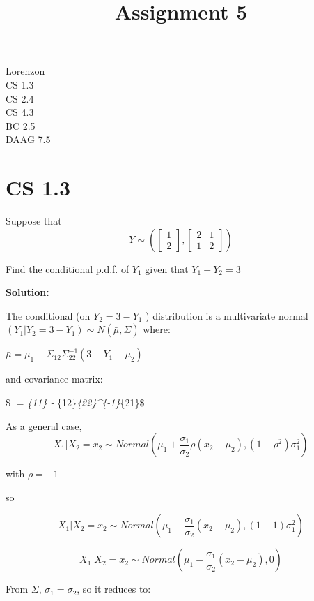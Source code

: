 \documentclass[11pt]{article}
\title{Assignment 5}
\begin{document}
    
    
    \maketitle
    
    

    
    Lorenzon\\
CS 1.3\\
CS 2.4\\
CS 4.3\\
BC 2.5\\
DAAG 7.5

    \hypertarget{cs-1.3}{%
\section{CS 1.3}\label{cs-1.3}}

    Suppose that \[ Y \sim 
\left(
\begin{bmatrix}
    1  \\
   2 
\end{bmatrix},
\begin{bmatrix}
2 & 1 \\
1 & 2  
\end{bmatrix}
\right) \]

Find the conditional p.d.f. of \(Y_1\) given that \(Y_1 + Y_2 = 3\)

    \textbf{Solution:}

The conditional (on \(Y_2 = 3 - Y_1\) ) distribution is a multivariate
normal \((Y_1 | Y_2 = 3 - Y_1) \sim N(\bar\mu , \bar\Sigma)\) where:

\(\bar\mu = \mu_1 + \Sigma_{12} \Sigma_{22}^{-1}(3 -Y_1 - \mu_2)\)

and covariance matrix:

\$ \bar\Sigma = \Sigma\emph{\{11\} -
\Sigma}\{12\}\Sigma\emph{\{22\}\^{}\{-1\}\Sigma}\{21\}\$

As a general case,
\[X_1 | X_2 = x_2 \sim Normal \left(\mu_1 + \frac{\sigma_1}{\sigma_2} \rho (x_2-\mu_2), (1-\rho^2)\sigma_1^2\right)\]

with \(\rho = -1\)

so

\[X_1 | X_2 = x_2 \sim Normal \left(\mu_1 - \frac{\sigma_1}{\sigma_2}  (x_2-\mu_2), (1-1)\sigma_1^2\right)\]

\[X_1 | X_2 = x_2 \sim Normal \left(\mu_1 - \frac{\sigma_1}{\sigma_2}  (x_2-\mu_2), 0\right)\]

From \(\Sigma\), \(\sigma_1 = \sigma_2\), so it reduces to:
\end{document}
